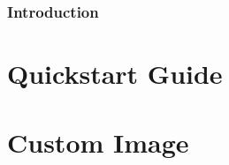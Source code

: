 \documentclass[a4paper,11pt]{article}
\begin{document}


\section*{Introduction}

\newpage

\part{Quickstart Guide}

\newpage

\part{Custom Image}

\end{document}
